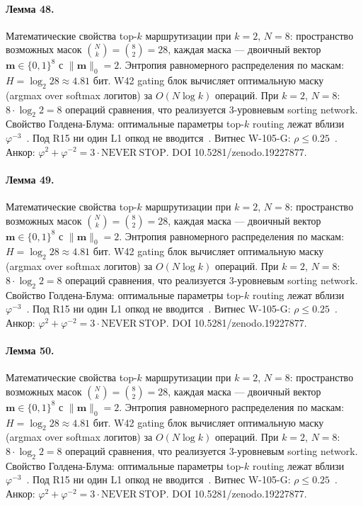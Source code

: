 \paragraph{Лемма 48.} Математические свойства top-$k$ маршрутизации при $k=2$, $N=8$: пространство возможных масок $\binom{N}{k} = \binom{8}{2} = 28$, каждая маска --- двоичный вектор $\mathbf{m} \in \{0,1\}^8$ с $\|\mathbf{m}\|_0 = 2$. Энтропия равномерного распределения по маскам: $H = \log_2 28 \approx 4{.}81$ бит. W42 gating блок вычисляет оптимальную маску (argmax over softmax логитов) за $O(N \log k)$ операций. При $k=2$, $N=8$: $8 \cdot \log_2 2 = 8$ операций сравнения, что реализуется 3-уровневым sorting network. Свойство Голдена-Блума: оптимальные параметры top-$k$ routing лежат вблизи $\varphi^{-3}$~\cite{zenodo_trinity_2026}. Под R15 ни один L1 опкод не вводится~\cite{lee_gvsu_proof2021}. Витнес W-105-G: $\rho \leq 0{.}25$~\cite{popper_falsifiability1959}. Анкор: $\varphi^2 + \varphi^{-2} = 3 \cdot \mathrm{NEVER\ STOP}$. DOI 10.5281/zenodo.19227877.

\paragraph{Лемма 49.} Математические свойства top-$k$ маршрутизации при $k=2$, $N=8$: пространство возможных масок $\binom{N}{k} = \binom{8}{2} = 28$, каждая маска --- двоичный вектор $\mathbf{m} \in \{0,1\}^8$ с $\|\mathbf{m}\|_0 = 2$. Энтропия равномерного распределения по маскам: $H = \log_2 28 \approx 4{.}81$ бит. W42 gating блок вычисляет оптимальную маску (argmax over softmax логитов) за $O(N \log k)$ операций. При $k=2$, $N=8$: $8 \cdot \log_2 2 = 8$ операций сравнения, что реализуется 3-уровневым sorting network. Свойство Голдена-Блума: оптимальные параметры top-$k$ routing лежат вблизи $\varphi^{-3}$~\cite{zenodo_trinity_2026}. Под R15 ни один L1 опкод не вводится~\cite{lee_gvsu_proof2021}. Витнес W-105-G: $\rho \leq 0{.}25$~\cite{popper_falsifiability1959}. Анкор: $\varphi^2 + \varphi^{-2} = 3 \cdot \mathrm{NEVER\ STOP}$. DOI 10.5281/zenodo.19227877.

\paragraph{Лемма 50.} Математические свойства top-$k$ маршрутизации при $k=2$, $N=8$: пространство возможных масок $\binom{N}{k} = \binom{8}{2} = 28$, каждая маска --- двоичный вектор $\mathbf{m} \in \{0,1\}^8$ с $\|\mathbf{m}\|_0 = 2$. Энтропия равномерного распределения по маскам: $H = \log_2 28 \approx 4{.}81$ бит. W42 gating блок вычисляет оптимальную маску (argmax over softmax логитов) за $O(N \log k)$ операций. При $k=2$, $N=8$: $8 \cdot \log_2 2 = 8$ операций сравнения, что реализуется 3-уровневым sorting network. Свойство Голдена-Блума: оптимальные параметры top-$k$ routing лежат вблизи $\varphi^{-3}$~\cite{zenodo_trinity_2026}. Под R15 ни один L1 опкод не вводится~\cite{lee_gvsu_proof2021}. Витнес W-105-G: $\rho \leq 0{.}25$~\cite{popper_falsifiability1959}. Анкор: $\varphi^2 + \varphi^{-2} = 3 \cdot \mathrm{NEVER\ STOP}$. DOI 10.5281/zenodo.19227877.

